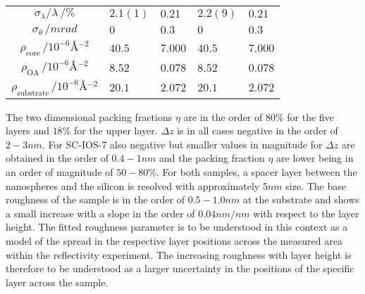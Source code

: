 \documentclass[\main/dresen_thesis.tex]{subfiles}
\begin{document}
\begin{table}[!htbp]
\begin{tabular}{ c | l | l | l | l}
       $\sigma_\lambda / \lambda\, / \unit{\%}$                      & $2.1(1)$  & $0.21$     & $2.2(9)$   & $0.21$\\
       $\sigma_\theta \, / \unit{mrad}$                              & $0$       & $0.3$      & $0$        & $0.3$ \\
       \hline
       $\rho_\mathrm{core}\, / \unit{10^{-6} \angstrom^{-2}}      $   & $40.5$  & $7.000$ & $40.5$ & $7.000$\\
       $\rho_\mathrm{OA}\, / \unit{10^{-6} \angstrom^{-2}}     $      & $8.52$  & $0.078$ & $8.52$ & $0.078$\\
       $\rho_\mathrm{substrate}\, / \unit{10^{-6} \angstrom^{-2}} $   & $20.1$  & $2.072$ & $20.1$ & $2.072$\\
      \hline
    \end{tabular}
  \end{table}
  The two dimensional packing fractions $\eta$ are in the order of $80 \unit{\%}$ for the five layers and $18 \unit{\%}$ for the upper layer.
  $\Delta z$ is in all cases negative in the order of $2 - 3 \unit{nm}$.
  For SC-IOS-7 also negative but smaller values in magnitude for $\Delta z$ are obtained in the order of $0.4 - 1 \unit{nm}$ and the packing fraction $\eta$ are lower being in an order of magnitude of $50 - 80 \unit{\%}$.
  For both samples, a spacer layer between the nanospheres and the silicon is resolved with approximately $5 \unit{nm}$ size.
  The base roughness of the sample is in the order of $0.5 - 1.0 \unit{nm}$ at the substrate and shows a small increase with a slope in the order of $0.04 \unit{nm / nm}$ with respect to the layer height.
  The fitted roughness parameter is to be understood in this context as a model of the spread in the respective layer positions across the measured area within the reflectivity experiment.
  The increasing roughness with layer height is therefore to be understood as a larger uncertainty in the positions of the specific layer across the sample.
\end{document}

